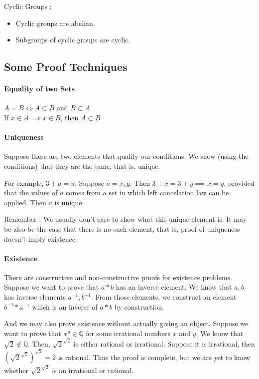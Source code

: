 \begin{remark}
	Cyclic Groups :
	\begin{itemize}
		\item Cyclic groups are abelian.%
		\item Subgroups of cyclic groups are cyclic.%
	\end{itemize}
\end{remark}

\subsection{Some Proof Techniques}
\paragraph{Equality of two Sets}
$A = B \iff A \subset B$ and $B \subset A$\\
If $x \in A \implies x \in B$, then $A \subset B$
\paragraph{Uniqueness}
	Suppose there are two elements that qualify our conditions.
	We show (using the conditions) that they are the same, that is, unique.

	For example, $3 + a = \pi$.
	Suppose $a = x,y$.
	Then $3 + x = 3 + y \implies x = y$, provided that the values of $a$ comes from a set in which left cancelation law can be applied.
	Then $a$ is unique.

	Remember : We usually don't care to show what this unique element is.
	It may be also be the case that there is no such element, that is, proof of uniqueness doesn't imply existence.

\paragraph{Existence}
	There are constructive and non-constructive proofs for existence problems.
	Suppose we want to prove that $a\ast b$ has an inverse element.
	We know that $a,b$ has inverse elements $a^{-1},b^{-1}$.
	From those elements, we construct an element $b^{-1} \ast a^{-1}$ which is an inverse of $a \ast b$ by construction.

	And we may also prove existence without actually giving an object.
	Suppose we want to prove that $x^y \in \mathbb{Q}$ for some irrational numbers $x$ and $y$.
	We know that $\sqrt{2} \notin \mathbb{Q}$.
	Then, $\sqrt{2}^{\sqrt{2}}$ is either rational or irrational.
	Suppose it is irrational, then $\left(\sqrt{2}^{\sqrt{2}}\right)^{\sqrt{2}} = 2$ is rational.
	Thus the proof is complete, but we are yet to know whether $\sqrt{2}^{\sqrt{2}}$ is an irrational or rational.

